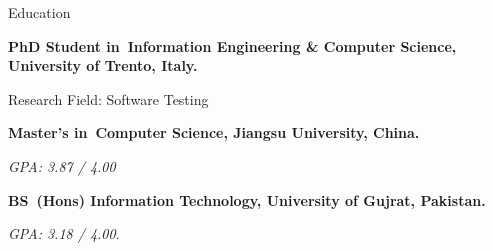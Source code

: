 \begin{rubric}{Education}

%
\entry*[2021 -- present]%
	\textbf{PhD Student in~Information Engineering \& Computer Science, University of Trento, Italy.}\par
	Research Field: Software Testing

\entry*[2018 -- 2021]%
	\textbf{Master's in~Computer Science, Jiangsu University, China.}\par
	 \textit{GPA: 3.87 / 4.00}
	
%
\entry*[2012 -- 2017]%
	\textbf{BS~(Hons) Information Technology, University of Gujrat, Pakistan.}\par
	\textit{GPA: 3.18 / 4.00}.
	

\end{rubric}